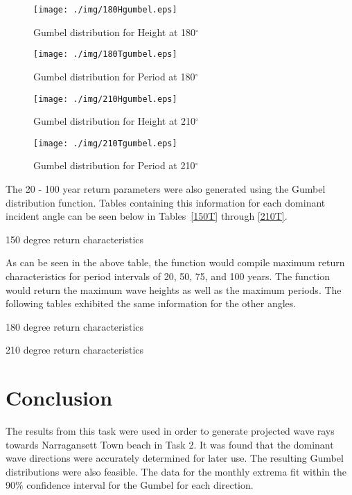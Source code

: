 \begin{figure}[H]
\centering
\begin{minipage}{0.49\textwidth}
	\texttt{[image: ./img/180Hgumbel.eps]}
	\caption{Gumbel distribution for Height at 180$^\circ$}
	\label{maxH180}
\end{minipage}
\begin{minipage}{0.49\textwidth}
	\texttt{[image: ./img/180Tgumbel.eps]}
	\caption{Gumbel distribution for Period at 180$^\circ$}
	\label{maxT180}
\end{minipage}
\end{figure}

\begin{figure}[H]
\centering
\begin{minipage}{0.49\textwidth}
	\texttt{[image: ./img/210Hgumbel.eps]}
	\caption{Gumbel distribution for Height at 210$^\circ$}
	\label{maxH210}
\end{minipage}
\begin{minipage}{0.49\textwidth}
	\texttt{[image: ./img/210Tgumbel.eps]}
	\caption{Gumbel distribution for Period at 210$^\circ$}
	\label{maxT210}
\end{minipage}
\end{figure}

The 20 - 100 year return parameters were also generated using the Gumbel distribution function. Tables containing this information for each dominant incident angle can be seen below in Tables~\ref{150T} through \ref{210T}.

\begin{table}[H]
	\centering
	
	\caption{150 degree return characteristics}
	\label{150T}
\end{table}

As can be seen in the above table, the function would compile maximum return characteristics for period intervals of 20, 50, 75, and 100 years. The function would return the maximum wave heights as well as the maximum periods. The following tables exhibited the same information for the other angles. 

\begin{table}[H]
	\centering
	
	\caption{180 degree return characteristics}
	\label{180T}
\end{table}

\begin{table}[H]
	\centering
	
	\caption{210 degree return characteristics}
	\label{210T}
\end{table}


\section{Conclusion}

The results from this task were used in order to generate projected wave rays towards Narragansett Town beach in Task 2. It was found that the dominant wave directions were accurately determined for later use. The resulting Gumbel distributions were also feasible. The data for the monthly extrema fit within the 90$\%$ confidence interval for the Gumbel for each direction. 
